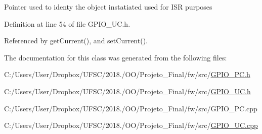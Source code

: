 Pointer used to identy the object instatiated used for I\+SR purposes 

Definition at line 54 of file G\+P\+I\+O\+\_\+\+U\+C.\+h.



Referenced by get\+Current(), and set\+Current().



The documentation for this class was generated from the following files\+:\begin{DoxyCompactItemize}
\item 
C\+:/\+Users/\+User/\+Dropbox/\+U\+F\+S\+C/2018./\+O\+O/\+Projeto\+\_\+\+Final/fw/src/\mbox{\hyperlink{_g_p_i_o___p_c_8h}{G\+P\+I\+O\+\_\+\+P\+C.\+h}}\item 
C\+:/\+Users/\+User/\+Dropbox/\+U\+F\+S\+C/2018./\+O\+O/\+Projeto\+\_\+\+Final/fw/src/\mbox{\hyperlink{_g_p_i_o___u_c_8h}{G\+P\+I\+O\+\_\+\+U\+C.\+h}}\item 
C\+:/\+Users/\+User/\+Dropbox/\+U\+F\+S\+C/2018./\+O\+O/\+Projeto\+\_\+\+Final/fw/src/G\+P\+I\+O\+\_\+\+P\+C.\+cpp\item 
C\+:/\+Users/\+User/\+Dropbox/\+U\+F\+S\+C/2018./\+O\+O/\+Projeto\+\_\+\+Final/fw/src/\mbox{\hyperlink{_g_p_i_o___u_c_8cpp}{G\+P\+I\+O\+\_\+\+U\+C.\+cpp}}\end{DoxyCompactItemize}
